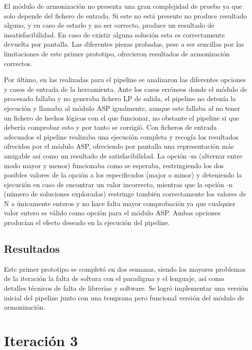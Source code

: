 El módulo de armonización no presenta una gran complejidad de prueba ya que solo depende del fichero de entrada. Si este no está presente no produce resultado alguno, y en caso de estarlo y no ser correcto, produce un resultado de insatisfacibilidad. En caso de existir alguna solución esta es correctamente devuelta por pantalla. Las diferentes piezas probadas, pese a ser sencillas por las limitaciones de este primer prototipo, ofrecieron resultados de armonización correctos.

Por último, en las realizadas para el pipeline se analizaron las diferentes opciones y casos de entrada de la herramienta. Ante los casos erróneos donde el módulo de procesado fallaba y no generaba fichero LP de salida, el pipeline no detenía la ejecución y llamaba al módulo ASP igualmente, aunque este fallaba al no tener un fichero de hechos lógicos con el que funcionar, no obstante el pipeline si que debería comprobar esto y por tanto se corrigió. Con ficheros de entrada adecuados el pipeline realizaba una ejecución completa y recogía los resultados ofrecidos por el módulo ASP, ofreciendo por pantalla una representación más amigable así como un resultado de satisfacibilidad. La opción -m (alternar entre modo mayor y menor) funcionaba como se esperaba, restringiendo los dos posibles valores de la opción a los especificados (major o minor) y deteniendo la ejecución en caso de encontrar un valor incorrecto, mientras que la opción -n (número de soluciones exploradas) restringe también correctamente los valores de N a únicamente enteros y no hace falta mayor comprobación ya que cualquier valor entero es válido como opción para el módulo ASP. Ambas opciones producían el efecto deseado en la ejecución del pipeline.

\subsection{Resultados}
Este primer prototipo se completó en dos semanas, siendo los mayores problemas de la iteración la falta de soltura con el paradigma y el lenguaje, así como detalles técnicos de falta de librerías y software. Se logró implementar una versión inicial del pipeline junto con una temprana pero funcional versión del módulo de armonización.


\section{Iteración 3}

